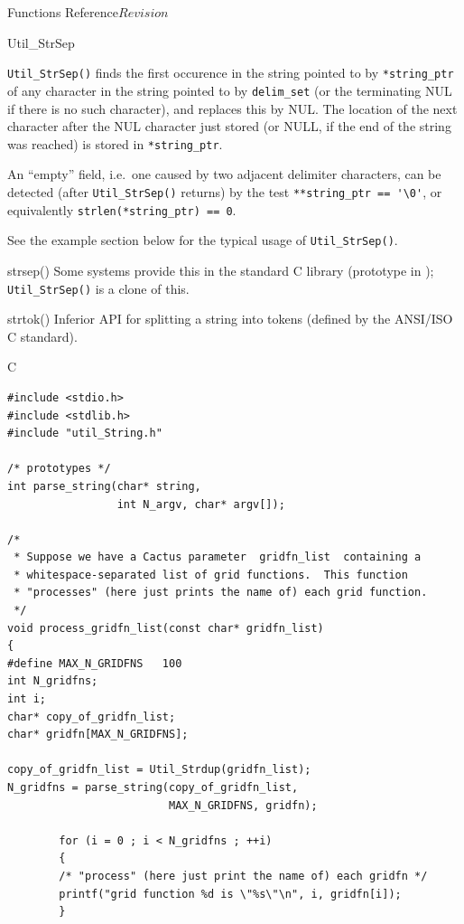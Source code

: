 \begin{cactuspart}{ Functions Reference}{}{$Revision$}
\begin{FunctionDescription}{Util\_StrSep}
\begin{Discussion}
\verb|Util_StrSep()| finds the first occurence in the string pointed
to by \verb|*string_ptr| of any character in the string pointed to by
\verb|delim_set| (or the terminating NUL if there is no such character),
and replaces this by NUL.  The location of the next character after the
NUL character just stored (or NULL, if the end of the string was reached)
is stored in \verb|*string_ptr|.

An ``empty'' field, i.e.\ one caused by two adjacent delimiter characters,
can be detected (after \verb|Util_StrSep()| returns) by the test
\verb|**string_ptr == '\0'|, or equivalently \verb|strlen(*string_ptr) == 0|.

See the example section below for the typical usage of \verb|Util_StrSep()|.
\end{Discussion}

\begin{SeeAlsoSection}
\begin{SeeAlso}{strsep()}
Some systems provide this in the standard C library
(prototype in ); \verb|Util_StrSep()| is a clone of this.
\end{SeeAlso}
\begin{SeeAlso}{strtok()}
Inferior API for splitting a string into tokens
(defined by the ANSI/ISO C standard).
\end{SeeAlso}
\end{SeeAlsoSection}

\begin{ExampleSection}
\begin{Example}{C}
\begin{verbatim}
#include <stdio.h>
#include <stdlib.h>
#include "util_String.h"

/* prototypes */
int parse_string(char* string,
                 int N_argv, char* argv[]);

/*
 * Suppose we have a Cactus parameter  gridfn_list  containing a
 * whitespace-separated list of grid functions.  This function
 * "processes" (here just prints the name of) each grid function.
 */
void process_gridfn_list(const char* gridfn_list)
{
#define MAX_N_GRIDFNS   100
int N_gridfns;
int i;
char* copy_of_gridfn_list;
char* gridfn[MAX_N_GRIDFNS];

copy_of_gridfn_list = Util_Strdup(gridfn_list);
N_gridfns = parse_string(copy_of_gridfn_list,
                         MAX_N_GRIDFNS, gridfn);

        for (i = 0 ; i < N_gridfns ; ++i)
        {
        /* "process" (here just print the name of) each gridfn */
        printf("grid function %d is \"%s\"\n", i, gridfn[i]);
        }


\end{verbatim}
\end{Example}
\end{ExampleSection}
\end{FunctionDescription}
\end{cactuspart}
